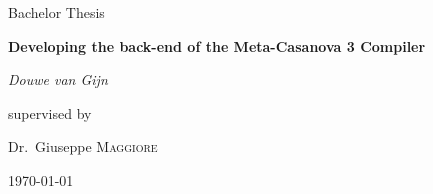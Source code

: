 \documentclass[12pt,a4paper]{report}
\begin{document}
\begin{titlepage}
	\centering
	{\Large Bachelor Thesis\par}
        \vspace{2cm}
	       {\huge\bfseries Developing the back-end of the Meta-Casanova 3 Compiler \par}
	\vfill
	{\Large\itshape Douwe van Gijn\par}
	\vfill
	supervised by\par
	Dr.~Giuseppe \textsc{Maggiore}
	\vfill
	{\large \today\par}
\end{titlepage}
\end{document}
